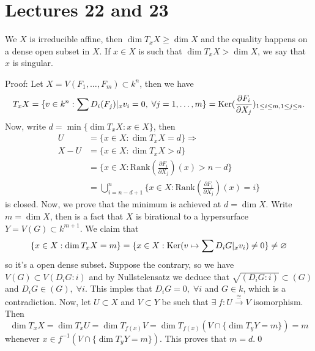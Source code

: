 \section{Lectures 22 and 23}

\begin{dang}
    \begin{proposition}
        We $X$ is irreducible affine, then $\dim T_xX \geq \dim X$ and the equality happens on a dense open subset 
        in $X$. If $x\in X$ is such that $\dim T_xX > \dim X$, we say that $x$ is singular. 
    \end{proposition}
\end{dang}
Proof: Let $X = V(F_1,\dots, F_m)\subset k^n$, then we have 
\begin{equation}
    T_xX =\{v\in k^n: \sum D_i(F_j)|_x v_i=0,\;\forall j=1,\dots,m\} = 
    \text{Ker}(\frac{\partial F_i}{\partial X_j})_{1\leq i\leq m, 1\leq j\leq n}.
\end{equation}
Now, write $d=\min\{\dim T_xX: x\in X\}$, then 
\begin{equation}
    \begin{split}
       U &= \{x\in X: \dim T_xX = d\}\Rightarrow\\
       X- U &=\{x\in X: \dim T_xX > d\}\\
       &=\{x\in X: \text{Rank}(\frac{\partial F_i}{\partial X_j})(x) > n - d\}\\
       &=\bigcup_{i=n-d+1}^n\{x\in X:\text{Rank}(\frac{\partial F_i}{\partial X_j})(x)=i\}
    \end{split}
\end{equation}
is closed. Now, we prove that the minimum is achieved at $d=\dim X$. Write $m=\dim X$, then is a fact that 
$X$ is birational to a hypersurface $Y=V(G)\subset k^{m+1}$. We claim that 
\begin{equation}
  \{x\in X: \dim T_xX = m\} = \{x\in X:\text{Ker}(v\mapsto \sum D_iG|_xv_i)\neq 0\}\neq\varnothing 
\end{equation}
so it's a open dense subset. Suppose the contrary, so we have $V(G)\subset V(D_i G:i)$ and by Nullstelensatz 
we deduce that $\sqrt{(D_iG:i)}\subset (G)$ and $D_iG\in (G),\;\forall i$. This imples that $D_iG=0,\;\forall i$ 
and $G\in k$, which is a contradiction. Now, let $U\subset X$ and $V\subset Y$ be such that 
$\exists\;f:U\overset{\cong}{\to}V$ isomorphism. Then 
\begin{equation}
   \dim T_xX = \dim T_xU = \dim T_{f(x)}V = \dim T_{f(x)}(V\cap \{\dim T_yY = m\}) = m
\end{equation} 
whenever $x\in f^{-1}(V\cap\{\dim T_yY = m\})$. This proves that $m=d$.\qed

